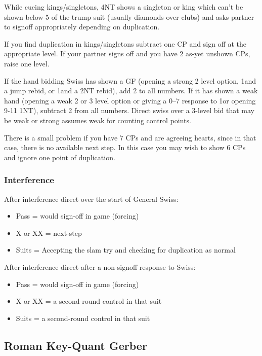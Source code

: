 \documentclass[a4paper,14pt]{extarticle}
\begin{document}
While cueing kings/singletons, 4NT shows a singleton or king which can't be
shown below 5 of the trump suit (usually diamonds over clubs) and asks partner
to signoff appropriately depending on duplication.

If you find duplication in kings/singletons subtract one CP and sign off at the
appropriate level. If your partner signs off and you have 2 as-yet unshown CPs,
raise one level.

If the hand bidding Swiss has shown a GF (opening a strong 2 level option,
1\diamonds and a jump rebid, or 1\diamonds and a 2NT rebid), add 2 to
all numbers. If it has shown a weak hand (opening a weak 2 or 3 level option or
giving a 0--7 response to 1\diamonds or opening 9-11 1NT), subtract 2 from
all numbers. Direct swiss over a 3-level bid that may be weak or strong assumes
weak for counting control points.

There is a small problem if you have 7 CPs and are agreeing hearts, since in
that case, there is no available next step. In this case you may wish to show
6 CPs and ignore one point of duplication.

\subsubsection{Interference}

After interference direct over the start of General Swiss:

\begin{itemize}
	\item Pass = would sign-off in game (forcing)
	\item X or XX = next-step
	\item Suits = Accepting the slam try and checking for duplication as normal
\end{itemize}

After interference direct after a non-signoff response to Swiss:

\begin{itemize}
	\item Pass = would sign-off in game (forcing)
	\item X or XX = a second-round control in that suit
	\item Suits = a second-round control in that suit
\end{itemize}

\subsection{Roman Key-Quant Gerber}
\label{sec:rkqg}
\end{document}
